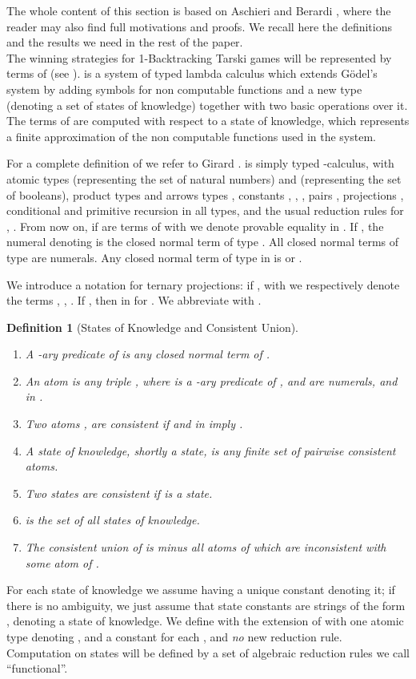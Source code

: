 \documentclass[copyright,creativecommons]{eptcs}
\newtheorem{definition}{Definition}
\begin{document}
The whole content of this section is based on Aschieri and Berardi \cite{Aschieri}, where the reader may also find full motivations and proofs. We recall here the definitions and the results we need in the rest of the paper.\\
The winning strategies for 1-Backtracking Tarski games will be represented by terms of  (see \cite{Aschieri}).  is a system of typed lambda calculus which extends G\"odel's system  by adding symbols for non computable functions and a new type  (denoting a set of states of knowledge) together with two basic operations over it. The terms of  are computed with respect to  a state of knowledge, which represents a finite approximation of the non computable functions used in the system. 

For a complete definition of  we refer to Girard \cite{Girard}.  is simply typed -calculus, with atomic types  (representing the set  of natural numbers) and  (representing the set  of booleans), product types  and arrows types , constants , , , pairs , projections , conditional  and primitive recursion  in all types, and the usual reduction rules  for , . From now on, if  are terms of  with  we denote provable equality in . If , the numeral denoting  is the closed normal term  of type .  All closed normal terms of type  are numerals. Any closed normal term of type  in  is  or .

We introduce a notation for ternary projections: if , with  we respectively denote the terms , , .
If , then  in  for . We abbreviate  with . 

\begin{definition} [States of Knowledge and Consistent Union]\label{definition-StateOfKnowledge}\begin{enumerate}
\item
A -ary {\em predicate} of  is any closed normal term  of .

\item
An atom is any triple , where  is a -ary predicate of , and  are  numerals, and  in .

\item
Two atoms ,  are {\em consistent} if  and  in  imply .


\item
A state of knowledge, shortly a {\em state}, is any finite set  of pairwise consistent atoms.

\item
Two states  are consistent if  is a state.

\item
 is the set of all states of knowledge.
\item
The {\em consistent union}  of  is  minus all atoms of  which are inconsistent with some atom of .
\end{enumerate}
\end{definition}
For each state of knowledge  we assume having a unique constant  denoting it; if there is no ambiguity, we just assume that state constants are strings of the form , denoting a state of knowledge. We define with  the extension of  with one atomic type  denoting , and a constant  for each , and {\em no} new reduction rule. Computation on states will be defined by a set of algebraic reduction rules we call ``functional''.
\end{document}
